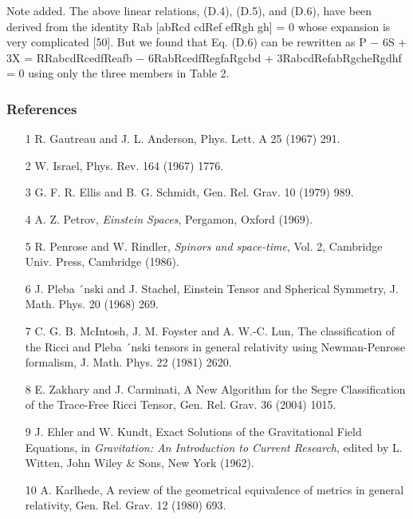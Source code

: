 \documentclass{article}
\begin{document}
Note added. The above linear relations, (D.4), (D.5), and (D.6), have been derived from the identity Rab [abRcd cdRef efRgh gh] = 0 whose expansion is very complicated [50]. But we found that Eq. (D.6) can be rewritten as P − 6S + 3X = RRabcdRcedfReafb − 6RabRcedfRegfaRgcbd + 3RabcdRefabRgcheRgdhf = 0 using only the three members in Table 2.

\subsubsection{References}
\begin{itemize}
\item 
[1] R. Gautreau and J. L. Anderson, Phys. Lett. A 25 (1967) 291.

\item 
[2] W. Israel, Phys. Rev. 164 (1967) 1776.

\item 
[3] G. F. R. Ellis and B. G. Schmidt, Gen. Rel. Grav. 10 (1979) 989.

\item 
[4] A. Z. Petrov, \textit{Einstein Spaces}, Pergamon, Oxford (1969).

\item 
[5] R. Penrose and W. Rindler, \textit{Spinors and space-time}, Vol. 2, Cambridge Univ. Press, Cambridge (1986).

\item 
[6] J. Pleba ´nski and J. Stachel, Einstein Tensor and Spherical Symmetry, J. Math. Phys. 20 (1968) 269.

\item 
[7] C. G. B. McIntosh, J. M. Foyster and A. W.-C. Lun, The classification of the Ricci and Pleba ´nski tensors in general relativity using Newman-Penrose formalism, J. Math. Phys. 22 (1981) 2620.

\item 
[8] E. Zakhary and J. Carminati, A New Algorithm for the Segre Classification of the Trace-Free Ricci Tensor, Gen. Rel. Grav. 36 (2004) 1015.

\item 
[9] J. Ehler and W. Kundt, Exact Solutions of the Gravitational Field Equations, in \textit{Gravitation: An Introduction to Current Research}, edited by L. Witten, John Wiley \& Sons, New York (1962).

\item 
[10] A. Karlhede, A review of the geometrical equivalence of metrics in general relativity, Gen. Rel. Grav. 12 (1980) 693.


\end{itemize}
\end{document}
